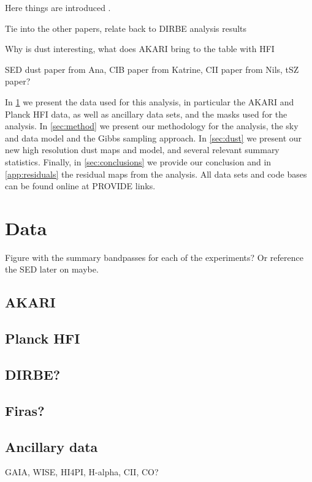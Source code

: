 \documentclass{aa}
\begin{document}
Here things are introduced \citep{planck2016-l01}.

Tie into the other papers, relate back to DIRBE analysis results

Why is dust interesting, what does AKARI bring to the table with HFI

SED dust paper from Ana, CIB paper from Katrine, CII paper from Nils, tSZ paper?

In \cref{sec:data} we present the data used for this analysis, in particular the AKARI and Planck HFI data, as well as ancillary data sets, and the masks used for the analysis. In \cref{sec:method} we present our methodology for the analysis, the sky and data model and the Gibbs sampling approach. 
In \cref{sec:dust} we present our new high resolution dust maps and model, and several relevant summary statistics. Finally, in \cref{sec:conclusions} we provide our conclusion and in \cref{app:residuals} the residual maps from the analysis. All data sets and code bases can be found online at PROVIDE links. 

\section{Data}
\label{sec:data}
Figure with the summary bandpasses for each of the experiments? Or reference the SED later on maybe. 
\subsection{AKARI}
\label{sec:dat_akari}


\subsection{Planck HFI}
\label{sec:dat_planck}

\subsection{DIRBE?}
\label{sec:dat_dirbe}

\subsection{Firas?}
\label{sec:dat_firas}

\subsection{Ancillary data}
GAIA, WISE, HI4PI, H-alpha, CII, CO? 
\end{document}
